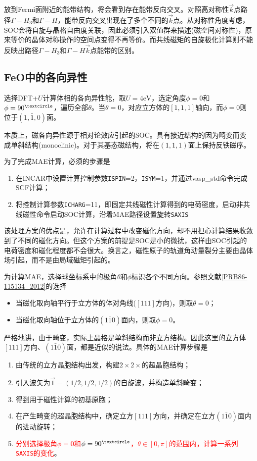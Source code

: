 放到\textrm{Fermi}面附近的能带结构，将会看到存在能带反向交叉。对照高对称性$\vec k$点路径$\Gamma-H_3$和$\Gamma-H$，能带反向交叉出现在了多个不同的$\vec k$点。从对称性角度考虑，\textrm{SOC}会将自旋与晶格自由度关联，因此必须引入双值群来描述(磁空间对称性)，原来等价的晶体对称操作的空间点变得不再等价。而共线磁矩的自旋极化计算则不能反映出路径$\Gamma-H_3$和$\Gamma-H$$\vec k$点能带的区别。

\subsection{\rm{FeO}中的各向异性}
选择\textrm{DFT}+$U$计算体相的各向异性能，取$U=4\mathrm{eV}$，选定角度$\phi=0$和$\phi=90^{\textcircle}$，遍历全部$\theta$。当$\theta=0$，对应立方体的$[1,1,1]$轴向，而$\phi=0$则位于$(1,\bar{1},0)$面。

本质上，磁各向异性源于相对论效应引起的\textrm{SOC}。具有接近结构的因为畸变而变成单斜结构\textrm{(monoclinic)}。对于其基态磁结构，将在$(1,1,1)$面上保持反铁磁序。%

为了完成\textrm{MAE}计算，必须的步骤是
\begin{enumerate}
	\item 在\textrm{INCAR}中设置计算控制参数\texttt{ISPIN}=2，\texttt{ISYM}=1，并通过\textrm{vasp\_std}命令完成\textrm{SCF}计算；
	\item 将控制计算参数\texttt{ICHARG}=11，即固定共线磁性计算得到的电荷密度，启动非共线磁性命令启动\textrm{SOC}计算，沿着\textrm{MAE}路径设置旋转\texttt{SAXIS}
\end{enumerate}
该处理方案的优点是，允许在计算过程中改变磁化方向，却不用担心计算结果收敛到了不同的磁化方向。但这个方案的前提是\textrm{SOC}是小的微扰，这样由\textrm{SOC}引起的电荷密度和磁化程度都不会很大。换言之，磁性原子的轨道角动量裂分主要由晶体场引起，而不是由局域磁矩引起的。

为计算\textrm{MAE}，选择球坐标系中的极角$\theta$和$\phi$标识各个不同方向。参照文献\ref{PRB86-115134_2012}的选择
\begin{itemize}
	\item 当磁化取向轴平行于立方体的体对角线($[111]$方向)，则取$\theta=0$；
	\item 当磁化取向轴位于立方体的$(1\bar{1}0)$面内，则取$\phi=0$。
\end{itemize}
严格地讲，由于畸变，实际上晶格是单斜结构而非立方结构。因此这里的立方体$[111]$方向、$(1\bar{1}0)$面，都是近似的说法。具体的\textrm{MAE}计算步骤是
\begin{enumerate}
	\item 由传统的立方晶胞结构出发，构建$2\times2\times$的超晶胞结构；
	\item 引入波矢为$\vec 1=(1/2,1/2,1/2)$的自旋波，并构造单斜畸变；
	\item 得到用于磁性计算的初基原胞；
	\item 在产生畸变的超晶胞结构中，确定立方$[111]$方向，并确定在立方$(1\bar{1}0)$面内的进动旋转；
	\item \textcolor{red}{分别选择极角$\phi=0$和$\phi=90^{\textcircle}$，$\theta\in[0,\pi]$的范围内，计算一系列\texttt{SAXIS}的变化}。
\end{enumerate}

